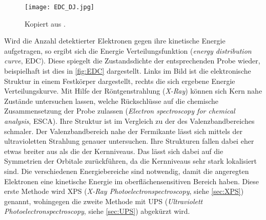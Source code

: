        \begin{figure}
            \centering
            \texttt{[image: EDC\_DJ.jpg]}
            \caption{Kopiert aus \cite{oura_surface_2003}.}
            \label{fig:EDC}
        \end{figure}
        Wird die Anzahl detektierter Elektronen gegen ihre kinetische Energie aufgetragen, so ergibt sich die Energie Verteilungsfunktion (\textit{energy distribution curve}, EDC).
        Diese spiegelt die Zustandsdichte der entsprechenden Probe wieder, beispielhaft ist dies in \autoref{fig:EDC} dargestellt.
        Links im Bild ist die elektronische Struktur in einem Festkörper dargestellt, rechts die sich ergebene Energie Verteilungskurve.
        Mit Hilfe der Röntgenstrahlung (\textit{X-Ray}) können sich Kern nahe Zustände untersuchen lassen, welche Rückschlüsse auf die chemische Zusammensetzung der Probe zulassen (\textit{Electron spectroscopy for chemical analysis}, ESCA).
        Ihre Struktur ist im Vergleich zu der des Valenzbandbereiches schmaler.
        Der Valenzbandbereich nahe der Fermikante lässt sich mittels der ultravioletten Strahlung genauer untersuchen.
        Ihre Strukturen fallen dabei eher etwas breiter aus als die der Kernniveaus.
        Das lässt sich dabei auf die Symmetrien der Orbitale zurückführen, da die Kernniveaus sehr stark lokalisiert sind.
        Die verschiedenen Energiebereiche sind notwendig, damit die angeregten Elektronen eine kinetische Energie im oberflächensensitiven Bereich haben.
        Diese erste Methode wird XPS (\textit{X-Ray Photoelectronspectroscopy}, siehe \autoref{sec:XPS}) genannt, wohingegen die zweite Methode mit UPS (\textit{Ultraviolett Photoelectronspectroscopy}, siehe \autoref{sec:UPS}) abgekürzt wird.
        
